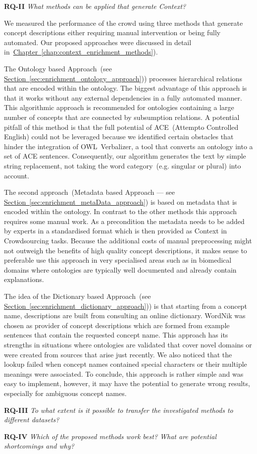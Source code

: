 \textbf{RQ-II} \emph{What methods can be applied that generate Context?}

We measured the performance of the crowd using three methods that generate concept descriptions either requiring manual intervention or being fully automated. Our proposed approaches were discussed in detail in~\hyperref[chap:context_enrichment_methods]{Chapter~\ref*{chap:context_enrichment_methods}}). 

The Ontology based Approach~(see \hyperref[sec:enrichment_ontology_approach]{Section~\ref*{sec:enrichment_ontology_approach}})) processes hierarchical relations that are encoded within the ontology. The biggest advantage of this approach is that it works without any external dependencies in a fully automated manner. This algorithmic approach is recommended for ontologies containing a large number of concepts that are connected by subsumption relations. A potential pitfall of this method is that the full potential of ACE~(Attempto Controlled English) could not be leveraged because we identified certain obstacles that hinder the integration of OWL~Verbalizer, a tool that converts an ontology into a set of ACE sentences. Consequently, our algorithm generates the text by simple string replacement, not taking the word category~(e.g. singular or plural) into account. 

The second approach~(Metadata based Approach --- see \hyperref[sec:enrichment_metaData_approach]{Section~\ref*{sec:enrichment_metaData_approach}})
is based on metadata that is encoded within the ontology. In contrast to the other methods this approach requires some manual work. As a precondition 
the metadata needs to be added by experts in a standardised format which is then provided as Context in Crowdsourcing tasks. Because the additional costs of manual preprocessing might not outweigh the benefits of high quality concept descriptions, it makes sense to preferable use this approach in very specialised areas such as in biomedical domains where ontologies are typically well documented and already contain explanations.

The idea of the Dictionary based Approach~(see \hyperref[sec:enrichment_dictionary_approach]{Section~\ref*{sec:enrichment_dictionary_approach}}))
is that starting from a concept name, descriptions are built from consulting an online dictionary. WordNik was chosen as provider of concept descriptions which are formed from example sentences that contain the requested concept name. This approach has its strengths in situations where 
ontologies are validated that cover novel domains or were created from sources that arise just recently. We also noticed that the lookup failed
when concept names contained special characters or their multiple meanings were associated. 
To conclude, this approach is rather simple and was easy to implement, however, it may have the potential to generate wrong results, especially for ambiguous concept names. 


\textbf{RQ-III} \emph{To what extent is it possible to transfer the investigated methods to different datasets?}

\textbf{RQ-IV} \emph{Which of the proposed methods work best? What are potential shortcomings and why?} 

